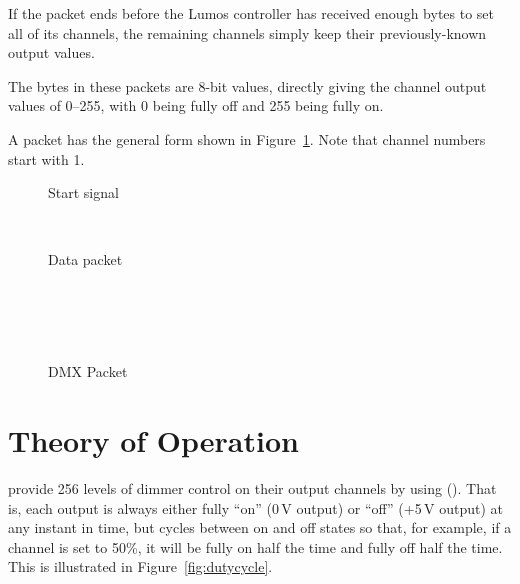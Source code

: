 \documentclass[letterpaper,twoside,onecolumn,openright,final]{memoir}
\begin{document}
\begin{NotImplemented*}
If the packet ends before the Lumos controller has received enough bytes to set all of its channels,
the remaining channels simply keep their previously-known output values.

The bytes in these packets are 8-bit values, directly giving the channel output values of 0--255, with 0
being fully off and 255 being fully on.

A packet has the general form shown in Figure~\ref{fig:dmx}. Note that  
channel numbers start with 1.
\begin{figure}
 \begin{BF}
  \begin{rightwordgroup}{Start signal}
  \\
  \end{rightwordgroup}\\
  \begin{rightwordgroup}{Data packet}
  \\
  \\
  \\
  \\
   \\
  \end{rightwordgroup}
 \end{BF}
 \caption{DMX Packet\label{fig:dmx}}
\end{figure}
\end{NotImplemented*}
\chapter{Theory of Operation}\label{ch:too}
 provide 256 levels of dimmer control on their
output channels by using  ().  That is, each output
is always either fully ``on'' (0\,V output) or ``off'' (+5\,V output) at any instant in
time, but cycles between on and off states so that, for example, if a channel is set
to 50\%, it will be fully on half the time and fully off half the time.  This is
illustrated in Figure~\ref{fig:dutycycle}.

\end{document}
